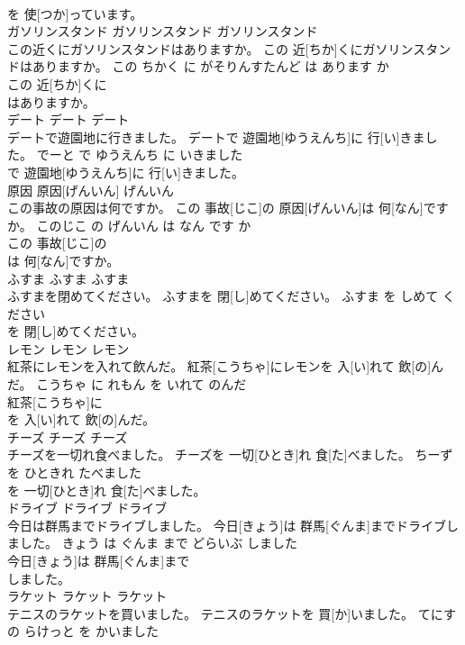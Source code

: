 \documentclass[8pt]{extreport}
\begin{document}
\begin{CJK}{UTF8}{min}
\\	を 使[つか]っています。			
\\	ガソリンスタンド	ガソリンスタンド	ガソリンスタンド	
\\	この近くにガソリンスタンドはありますか。	この 近[ちか]くにガソリンスタンドはありますか。	この ちかく に がそりんすたんど は あります か	
\\	この 近[ちか]くに
\\	はありますか。			
\\	デート	デート	デート	
\\	デートで遊園地に行きました。	デートで 遊園地[ゆうえんち]に 行[い]きました。	でーと で ゆうえんち に いきました	
\\	で 遊園地[ゆうえんち]に 行[い]きました。			
\\	原因	原因[げんいん]	げんいん	
\\	この事故の原因は何ですか。	この 事故[じこ]の 原因[げんいん]は 何[なん]ですか。	このじこ の げんいん は なん です か	
\\	この 事故[じこ]の
\\	は 何[なん]ですか。			
\\	ふすま	ふすま	ふすま	
\\	ふすまを閉めてください。	ふすまを 閉[し]めてください。	ふすま を しめて ください	
\\	を 閉[し]めてください。			
\\	レモン	レモン	レモン	
\\	紅茶にレモンを入れて飲んだ。	紅茶[こうちゃ]にレモンを 入[い]れて 飲[の]んだ。	こうちゃ に れもん を いれて のんだ	
\\	紅茶[こうちゃ]に
\\	を 入[い]れて 飲[の]んだ。			
\\	チーズ	チーズ	チーズ	
\\	チーズを一切れ食べました。	チーズを 一切[ひとき]れ 食[た]べました。	ちーず を ひときれ たべました	
\\	を 一切[ひとき]れ 食[た]べました。			
\\	ドライブ	ドライブ	ドライブ	
\\	今日は群馬までドライブしました。	今日[きょう]は 群馬[ぐんま]までドライブしました。	きょう は ぐんま まで どらいぶ しました	
\\	今日[きょう]は 群馬[ぐんま]まで
\\	しました。			
\\	ラケット	ラケット	ラケット	
\\	テニスのラケットを買いました。	テニスのラケットを 買[か]いました。	てにす の らけっと を かいました	

\end{CJK}
\end{document}
